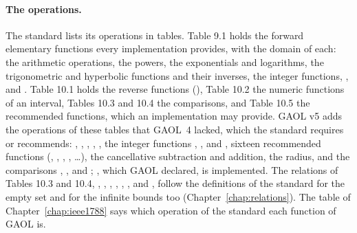 \documentclass[12pt,a4paper,twoside,openright]{book}
\begin{document}
\paragraph{The operations.} The standard lists its operations in tables.
Table 9.1 holds the forward elementary functions every implementation
provides, with the domain of each: the arithmetic operations, the powers,
the exponentials and logarithms, the trigonometric and hyperbolic functions
and their inverses, the integer functions, ,  and
. Table 10.1 holds the reverse functions
(), Table 10.2 the numeric functions of an
interval, Tables 10.3 and 10.4 the comparisons, and Table 10.5 the
recommended functions, which an implementation may provide. GAOL v5 adds
the operations of these tables that GAOL~4 lacked, which the standard
requires or recommends: , , ,
, , the integer functions , ,
 and , sixteen
recommended functions (, , ,
, \ldots), the cancellative subtraction and
addition, the radius, and the comparisons ,
,  and ;
, which GAOL declared, is implemented.\newinvfive{} The
relations of Tables 10.3 and 10.4, , ,
, , , ,
 and , follow the definitions of the standard
for the empty set and for the infinite bounds too
(Chapter~\ref{chap:relations}).\newinvfive{} The table of
Chapter~\ref{chap:ieee1788} says which operation of the standard each
function of GAOL is.
%
\end{document}
